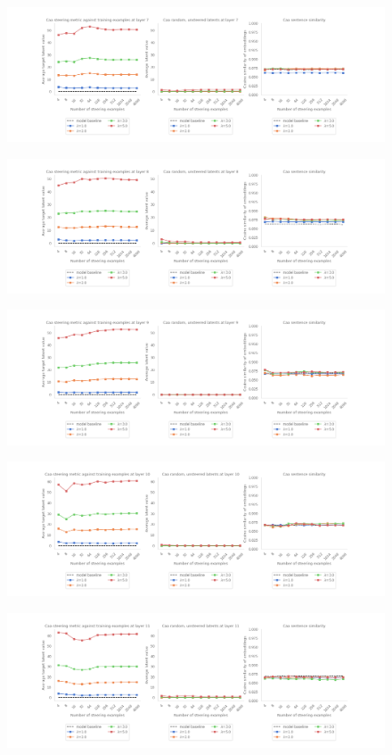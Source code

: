\begin{figure}
    \centering
        \includegraphics[width=\textwidth]{figures/gpt2_sweep_7.png}
        \label{fig:7}
\end{figure}

\begin{figure}
    \centering
    \includegraphics[width=\textwidth]{figures/gpt2_sweep_8.png}
    \label{fig:8}
\end{figure}

\begin{figure}
    \centering
        \includegraphics[width=\textwidth]{figures/gpt2_sweep_9.png}
        \label{fig:9}
\end{figure}

\begin{figure}
    \centering
        \includegraphics[width=\textwidth]{figures/gpt2_sweep_10.png}
        \label{fig:10}
\end{figure}

\begin{figure}
    \centering
    \includegraphics[width=\textwidth]{figures/gpt2_sweep_11.png}
    \label{fig:11}
\end{figure}
